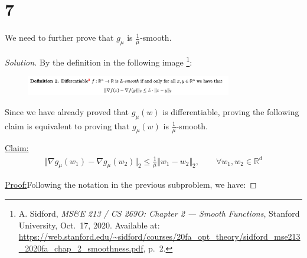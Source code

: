 \documentclass{article}
\newenvironment{solution}
  {\renewcommand\qedsymbol{$\blacksquare$}\begin{proof}[Solution]}
  {\end{proof}}
\newenvironment{claim}[1]{\par\noindent\underline{Claim:}\space#1}{}
\newenvironment{claimproof}[1]{\par\noindent\underline{Proof:}\space#1}{}
\begin{document}
\section*{7}

We need to further prove that $g_\mu$ is $\frac{1}{\mu}$-smooth.

\begin{solution}

    By the definition in the following image
    \footnote{A. Sidford, \textit{MS\&E 213 / CS 269O: Chapter 2 — Smooth Functions}, Stanford University, Oct.~17, 2020. Available at: \url{https://web.stanford.edu/~sidford/courses/20fa_opt_theory/sidford_mse213_2020fa_chap_2_smoothness.pdf}, p.~2.}:

    \begin{figure}[H]
        \centering
        \includegraphics[width = 0.8\textwidth]{L_smooth_def.png}
    \end{figure}




    Since we have already proved that $g_\mu(w)$ is differentiable, 
    proving the following claim is equivalent to proving that $g_\mu(w)$ is $\frac{1}{\mu}$-smooth.

    \bigskip

    \begin{claim}
        \begin{align*}
            \Vert \nabla g_\mu(w_1) - \nabla g_\mu(w_2) \Vert_2 \leq \frac{1}{\mu} \Vert w_1 - w_2 \Vert_2, \qquad \forall w_1, w_2 \in \mathbb{R}^d
        \end{align*}
    \end{claim}

    \begin{claimproof}
        Following the notation in the previous subproblem, we have:
        

\end{claimproof}
\end{solution}
\end{document}
